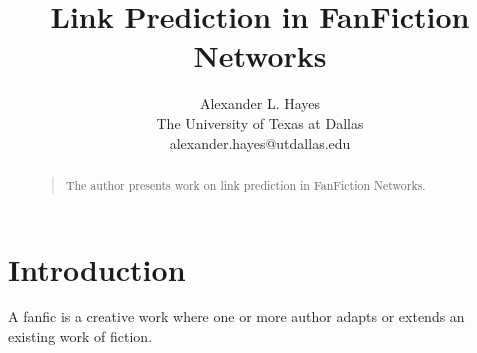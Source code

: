 \documentclass[letterpaper]{article}
\begin{document}
%
\title{Link Prediction in FanFiction Networks}
\author{Alexander L. Hayes\\
The University of Texas at Dallas\\
alexander.hayes@utdallas.edu\\
}

\maketitle
\begin{abstract}
\begin{quote}
The author presents work on link prediction in FanFiction Networks.
\end{quote}
\end{abstract}

\section{Introduction}
A fanfic is a creative work where one or more author adapts or extends an existing work of fiction.
\end{document}
